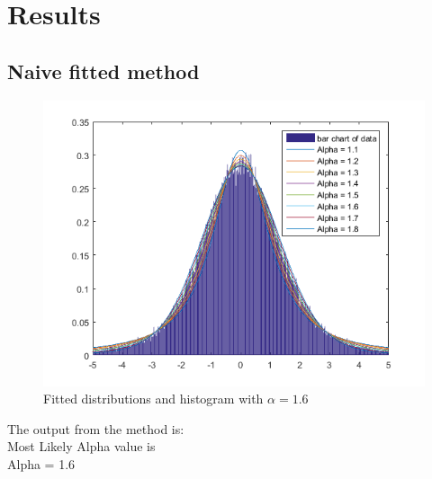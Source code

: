\chapter{Results}
\section{Naive fitted method}
\begin{figure}[H]
\centering
\includegraphics[width=1\textwidth]{billeder/alpha1_6_naivefit}
\caption{Fitted distributions and histogram with $\alpha = 1.6$}
\label{fig:naivefitres}
\end{figure}
The output from the method is:\\
Most Likely Alpha value is\\
Alpha = 1.6\\

